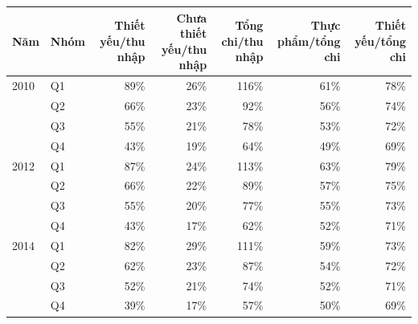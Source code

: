 \begin{tabular}{llrrrrr}
\toprule
Năm & Nhóm & Thiết yếu/thu nhập & Chưa thiết yếu/thu nhập & Tổng chi/thu nhập & Thực phẩm/tổng chi & Thiết yếu/tổng chi \\
\midrule
2010 & Q1 & 89\% & 26\% & 116\% & 61\% & 78\% \\
 & Q2 & 66\% & 23\% & 92\% & 56\% & 74\% \\
 & Q3 & 55\% & 21\% & 78\% & 53\% & 72\% \\
 & Q4 & 43\% & 19\% & 64\% & 49\% & 69\% \\
2012 & Q1 & 87\% & 24\% & 113\% & 63\% & 79\% \\
 & Q2 & 66\% & 22\% & 89\% & 57\% & 75\% \\
 & Q3 & 55\% & 20\% & 77\% & 55\% & 73\% \\
 & Q4 & 43\% & 17\% & 62\% & 52\% & 71\% \\
2014 & Q1 & 82\% & 29\% & 111\% & 59\% & 73\% \\
 & Q2 & 62\% & 23\% & 87\% & 54\% & 72\% \\
 & Q3 & 52\% & 21\% & 74\% & 52\% & 71\% \\
 & Q4 & 39\% & 17\% & 57\% & 50\% & 69\% \\
\bottomrule
\end{tabular}
